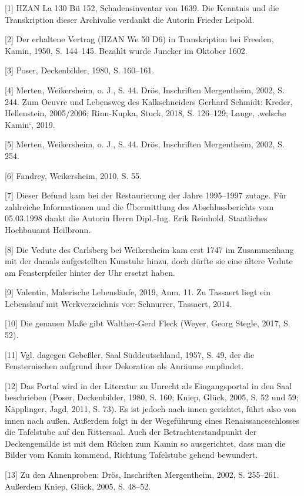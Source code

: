 \documentclass[
  letterpaper,
]{book}
\begin{document}
{[}1{]} HZAN La 130 Bü 152, Schadensinventar von 1639. Die Kenntnis und
die Transkription dieser Archivalie verdankt die Autorin Frieder
Leipold.

{[}2{]} Der erhaltene Vertrag (HZAN We 50 D6) in Transkription bei
Freeden, Kamin, 1950, S. 144--145. Bezahlt wurde Juncker im Oktober
1602.

{[}3{]} Poser, Deckenbilder, 1980, S. 160--161.

{[}4{]} Merten, Weikersheim, o. J., S. 44. Drös, Inschriften
Mergentheim, 2002, S. 244. Zum Oeuvre und Lebensweg des Kalkschneiders
Gerhard Schmidt: Kreder, Hellenstein, 2005/2006; Rinn-Kupka, Stuck,
2018, S. 126--129; Lange, ‚welsche Kamin`, 2019.

{[}5{]} Merten, Weikersheim, o. J., S. 44. Drös, Inschriften
Mergentheim, 2002, S. 254.

{[}6{]} Fandrey, Weikersheim, 2010, S. 55.

{[}7{]} Dieser Befund kam bei der Restaurierung der Jahre 1995--1997
zutage. Für zahlreiche Informationen und die Übermittlung des
Abschlussberichts vom 05.03.1998 dankt die Autorin Herrn Dipl.-Ing. Erik
Reinhold, Staatliches Hochbauamt Heilbronn.

{[}8{]} Die Vedute des Carlsberg bei Weikersheim kam erst 1747 im
Zusammenhang mit der damals aufgestellten Kunstuhr hinzu, doch dürfte
sie eine ältere Vedute am Fensterpfeiler hinter der Uhr ersetzt haben.

{[}9{]} Valentin, Malerische Lebensläufe, 2019, Anm. 11. Zu Tassaert
liegt ein Lebenslauf mit Werkverzeichnis vor: Schnurrer, Tassaert, 2014.

{[}10{]} Die genauen Maße gibt Walther-Gerd Fleck (Weyer, Georg Stegle,
2017, S. 52).

{[}11{]} Vgl. dagegen Gebeßler, Saal Süddeutschland, 1957, S. 49, der
die Fensternischen aufgrund ihrer Dekoration als Anräume empfindet.

{[}12{]} Das Portal wird in der Literatur zu Unrecht als Eingangsportal
in den Saal beschrieben (Poser, Deckenbilder, 1980, S. 160; Kniep,
Glück, 2005, S. 52 und 59; Käpplinger, Jagd, 2011, S. 73). Es ist jedoch
nach innen gerichtet, führt also von innen nach außen. Außerdem folgt in
der Wegeführung eines Renaissanceschlosses die Tafelstube auf den
Rittersaal. Auch der Betrachterstandpunkt der Deckengemälde ist mit dem
Rücken zum Kamin so ausgerichtet, dass man die Bilder vom Kamin kommend,
Richtung Tafelstube gehend bewundert.

{[}13{]} Zu den Ahnenproben: Drös, Inschriften Mergentheim, 2002, S.
255--261. Außerdem Kniep, Glück, 2005, S. 48--52.
\end{document}
